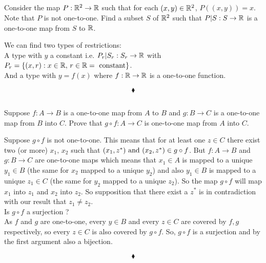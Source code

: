 \subsection{}
\begin{tcolorbox}
Consider the map $P:\mathbb{R}^2\rightarrow \mathbb{R}$ such that for each $(x,y)\in \mathbb{R}^2$, $P\left((x,y)\right)=x$. Note that $P$ is not one-to-one. Find a subset $S$ of $\mathbb{R}^2$ such that $P | S:S\rightarrow \mathbb{R}$ is a one-to-one map from $S$ to $\mathbb{R}$.
\end{tcolorbox}
$$ $$ 
We can find two types of restrictions:\\
A type with $y$ a constant i.e. $P_r | S_r:S_r\rightarrow \mathbb{R}$ with $P_r=\{(x,r): x\in\mathbb{R},\, r\in \mathbb{R} = \text{ constant}\}$.\\

And a type with $y= f(x)$ where $f:\mathbb{R}\rightarrow \mathbb{R}$ is a one-to-one function.
 
$$\blacklozenge$$

\subsection{}
\begin{tcolorbox}
Suppose $f: A\rightarrow B$ is a one-to-one map from $A$ to $B$ and $g:B\rightarrow C$ is a one-to-one map from $B$ into $C$. Prove that $g\circ f:A\rightarrow C$ is one-to-one map from $A$ into $C$.
\end{tcolorbox}
Suppose $g\circ f$ is not one-to-one. This means that for at least one $z\in C$ there exist two (or more) $x_1,\, x_2$ such that $(x_1,z^{*})\text{ and } (x_2,z^{*})\in g\circ f$. But $f: A\rightarrow B$ and $g:B\rightarrow C$ are one-to-one maps which means that $x_1\in A$ is mapped to a unique $y_1\in B$ (the same for  $x_2$ mapped to a unique $y_2$) and also $y_1\in B$ is mapped to a unique $z_1\in C$ (the same for $y_2$ mapped to a unique $z_2$). So the map $ g\circ f$ will map $x_1$ into $z_1$ and $x_2$ into $z_2$. So supposition that there exist a $z^{*}$ is in contradiction with our result that $z_1\ne z_2$. \\
Is $g\circ f$ a surjection ?\\
As $f$ and $g$ are one-to-one, every $y\in B$ and every $z\in C$ are covered by $f,g$ respectively, so every $z\in C$ is also covered by $g\circ f$. So, $g\circ f$ is a surjection and by the first argument also a bijection. 
$$ $$ 

 
$$\blacklozenge$$


